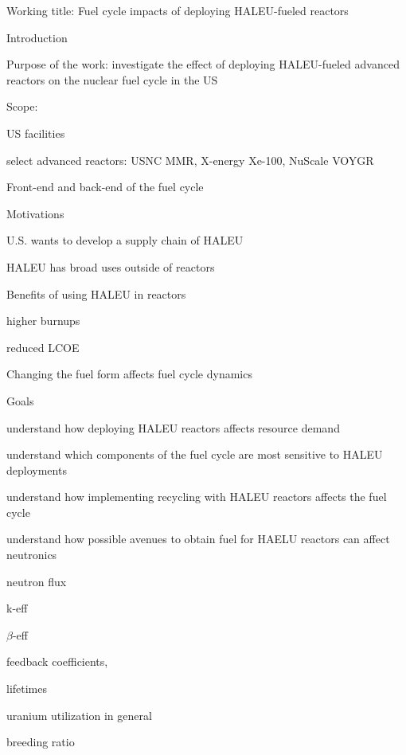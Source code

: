 \documentclass{report}
\begin{document}
\noindent Working title: Fuel cycle impacts of deploying \gls{HALEU}-fueled reactors
\begin{outline}
\item Introduction
\begin{outline}
    \item Purpose of the work: investigate the effect of deploying HALEU-fueled 
          advanced reactors on the nuclear fuel cycle in the US 
    \item Scope:
    \begin{outline}
        \item US facilities
        \item select advanced reactors: USNC MMR, X-energy Xe-100, NuScale VOYGR
        \item Front-end and back-end of the fuel cycle
    \end{outline}
    \item Motivations
    \begin{outline}
        \item U.S. wants to develop a supply chain of HALEU
        \item HALEU has broad uses outside of reactors \cite{nagley_ha-leu_2020}
        \item Benefits of using HALEU in reactors 
        \begin{outline}
            \item higher burnups
            \item reduced LCOE
        \end{outline}
        \item Changing the fuel form affects fuel cycle dynamics
    \end{outline}
    \item Goals
    \begin{outline}
        \item understand how deploying HALEU reactors affects resource demand
        \item understand which components of the fuel cycle are most sensitive to HALEU deployments
        \item understand how implementing recycling with HALEU reactors affects the fuel cycle
        \item understand how possible avenues to obtain fuel for HAELU reactors can affect neutronics
        \begin{outline}
            \item neutron flux
            \item k-eff 
            \item $\beta$-eff
            \item feedback coefficients, 
            \item lifetimes 
            \item uranium utilization in general
            \item breeding ratio
        \end{outline}
    \end{outline}
\end{outline}


\end{outline}
\end{document}
